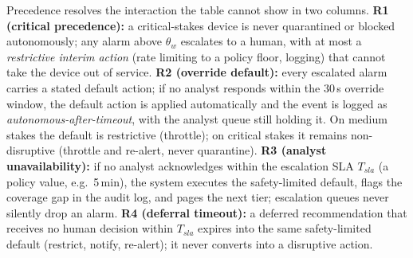 \documentclass[sigconf,review,anonymous]{acmart}
\begin{document}
Precedence resolves the interaction the table cannot show in two columns. \textbf{R1 (critical precedence):} a critical-stakes device is never quarantined or blocked autonomously; any alarm above $\theta_w$ escalates to a human, with at most a \emph{restrictive interim action} (rate limiting to a policy floor, logging) that cannot take the device out of service. \textbf{R2 (override default):} every escalated alarm carries a stated default action; if no analyst responds within the 30\,s override window, the default action is applied automatically and the event is logged as \emph{autonomous-after-timeout}, with the analyst queue still holding it. On medium stakes the default is restrictive (throttle); on critical stakes it remains non-disruptive (throttle and re-alert, never quarantine). \textbf{R3 (analyst unavailability):} if no analyst acknowledges within the escalation SLA $T_{sla}$ (a policy value, e.g.\ 5\,min), the system executes the safety-limited default, flags the coverage gap in the audit log, and pages the next tier; escalation queues never silently drop an alarm. \textbf{R4 (deferral timeout):} a deferred recommendation that receives no human decision within $T_{sla}$ expires into the same safety-limited default (restrict, notify, re-alert); it never converts into a disruptive action.
\end{document}
